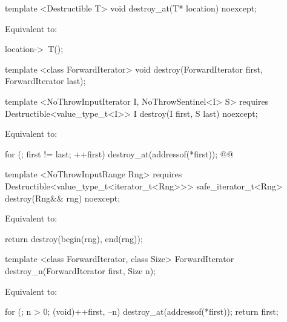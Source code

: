 {\color{addclr}
\begin{codeblock}
template <Destructible T>
void destroy_at(T* location) noexcept;
\end{codeblock}
} %

\setcounter{Paras}{0}
\pnum
\effects Equivalent to:
\begin{codeblock}
    location->~T();
\end{codeblock}

{\color{remclr}
\begin{codeblock}
template <class ForwardIterator>
  void destroy(ForwardIterator first, ForwardIterator last);
\end{codeblock}
} %

{\color{addclr}
\begin{codeblock}
template <NoThrowInputIterator I, NoThrowSentinel<I> S>
requires
  Destructible<value_type_t<I>>
I destroy(I first, S last) noexcept;
\end{codeblock}
} %

\pnum
\effects Equivalent to:
\begin{codeblock}
    for (; first != last; ++first)
      destroy_at(addressof(*first));
    @@
\end{codeblock}


{\color{addclr}
\begin{codeblock}
template <NoThrowInputRange Rng>
requires
  Destructible<value_type_t<iterator_t<Rng>>>
safe_iterator_t<Rng> destroy(Rng&& rng) noexcept;
\end{codeblock}

\pnum
\effects Equivalent to:
\begin{codeblock}
    return destroy(begin(rng), end(rng));
\end{codeblock}
} %

{\color{remclr}
\begin{codeblock}
template <class ForwardIterator, class Size>
  ForwardIterator destroy_n(ForwardIterator first, Size n);
\end{codeblock}

\setcounter{Paras}{2}
\pnum
\effects Equivalent to:
\begin{codeblock}
      for (; n > 0; (void)++first, --n)
          destroy_at(addressof(*first));
        return first;
\end{codeblock}
} %

